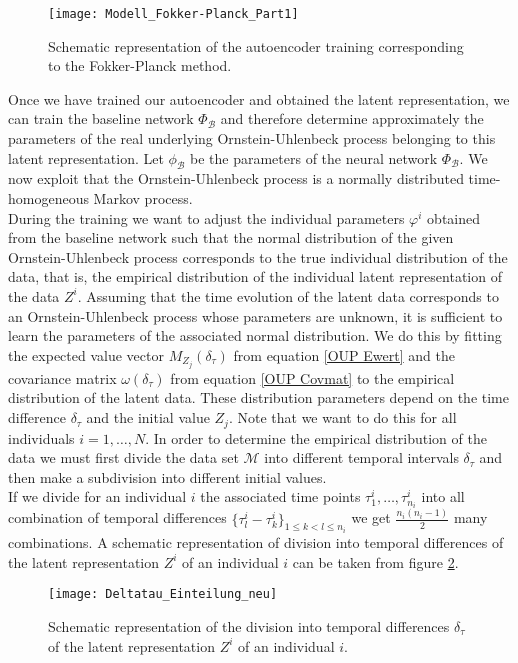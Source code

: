\documentclass[11pt,titlepage]{article}
\theoremstyle{definition}
\theoremstyle{remark}
\begin{document}
	\begin{figure}[h!]
		\centering
		\texttt{[image: Modell\_Fokker-Planck\_Part1]}
		\caption{Schematic representation of the autoencoder training corresponding to the Fokker-Planck method.}
		\label{Abb model FP part 1}
	\end{figure}
	
	Once we have trained our autoencoder and obtained the latent representation, we can train the baseline network $\Phi_\mathcal{B}$ and therefore determine approximately the parameters of the real underlying Ornstein-Uhlenbeck process belonging to this latent representation.
	Let $\phi_\mathcal{B}$ be the parameters of the neural network $\Phi_\mathcal{B}$. We now exploit that the Ornstein-Uhlenbeck process is a normally distributed time-homogeneous Markov process. \\
	During the training we want to adjust the individual parameters $\varphi^i$ obtained from the baseline network such that the normal distribution of the given Ornstein-Uhlenbeck process corresponds to the true individual distribution of the data, that is, the empirical distribution of the individual latent representation of the data $Z^i$. Assuming that the time evolution of the latent data corresponds to an Ornstein-Uhlenbeck process whose parameters are unknown, it is sufficient to learn the parameters of the associated normal distribution. We do this by fitting the expected value vector $M_{Z_j}(\delta_\tau)$ from equation \ref{OUP Ewert} and the covariance matrix $\omega(\delta_\tau)$ from equation \ref{OUP Covmat} to the empirical distribution of the latent data. These distribution parameters depend on the time difference $\delta_\tau$ and the initial value $Z_j$. Note that we want to do this for all individuals $i=1,\ldots, N$. In order to determine the empirical distribution of the data we must first divide the data set $\mathcal{M}$ into different temporal intervals $\delta_\tau$ and then make a subdivision into different initial values. \\
	If we divide for an individual $i$ the associated time points $\tau^i_1,\ldots, \tau^i_{n_i}$ into all combination of temporal differences $\{\tau^i_l - \tau^i_k\}_{1\leq k <l\leq n_i}$ we get $\frac{n_i(n_i -1)}{2}$ many combinations. A schematic representation of division into temporal differences of the latent representation $Z^i$ of an individual $i$ can be taken from figure \ref{Abb Delta tau Einteilung}.
	\begin{figure}[h!]
			\centering
			\texttt{[image: Deltatau\_Einteilung\_neu]}
			\caption{Schematic representation of the division into temporal differences $\delta_\tau$ of the latent representation $Z^i$ of an individual $i$.}
			\label{Abb Delta tau Einteilung}
	\end{figure}
\end{document}

